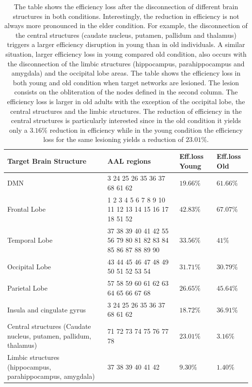 \documentclass[12pt,a4paper]{article}
\begin{document}
\begin{table}[!htbp]
\centering%

\newpage
\begin{tabularx}{\linewidth}{XXXX}
\toprule
Target Brain Structure & AAL regions & Eff.loss Young &Eff.loss Old\\
\midrule
\midrule
DMN & 3 24 25 26 35 36 37 68 61 62 & $19.66\%$& $61.66\%$\\
\midrule
Frontal Lobe & 1 2 3 4 5 6 7 8 9 10 11 12 13 14 15 16 17 18 51 52 & $42.83\%$& $67.07\%$\\
\midrule
  Temporal Lobe & 37 38 39 40 41 42 55 56 79 80 81 82 83 84 85 86 87 88 89 90 & $33.56\%$& $41\%$\\
      \midrule
      Occipital Lobe & 43 44 45 46 47 48 49 50 51 52 53 54 & $31.71\%$& $30.79\%$\\
	 \midrule      
	 Parietal Lobe & 57 58 59 60 61 62 63 64 65 66 67 68 & $26.65\%$& $45.64\%$\\
	\midrule      
	Insula and cingulate gyrus & 3 24 25 26 35 36 37 68 61 62 & $18.72\%$& $36.91\%$\\
   \midrule     
    Central structures (Caudate nucleus, putamen, pallidum, thalamus) & 71 72 73 74 75 76 77 78 & $23.01\%$& $3.16\%$\\
     \midrule 
     Limbic structures (hippocampus, parahippocampus, amygdala) & 37 38 39 40 41 42 & $9.30\%$& $1.40\%$\\
     \bottomrule
\end{tabularx}
\caption{The table shows the efficiency loss after the disconnection of different brain structures in both conditions. Interestingly, the reduction in efficiency is not always more pronounced in the elder condition. For example, the disconnection of the central structures (caudate nucleus, putamen, pallidum and thalamus) triggers a larger efficiency disruption in young than in old individuals. A similar situation, larger efficiency loss in young compared old condition, also occurs with the disconnection of the limbic structures (hippocampus, parahippocampus and amygdala) and the occipital lobe areas. The table shows the efficiency loss in both young and old condition when target networks are lesioned. The lesion consists on the obliteration of the nodes defined in the second column. The efficiency loss is larger in old adults with the exception of the occipital lobe, the central structures and the limbic structures. The reduction of efficiency in the central structures is particularly interested since in the old condition it yields only a $3.16\%$ reduction in efficiency while in the young condition the efficiency loss for the same lesioning yields a reduction of $23.01\%$.}
\label{tab:nodesn}
\end{table}
\end{document}
